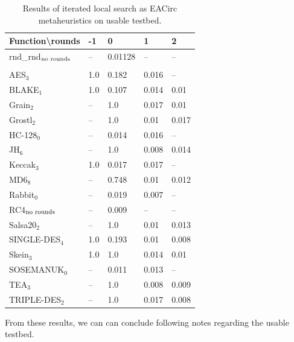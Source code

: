 \documentclass[
  print, %
  Table,   %
  nolof,     %
  nolot,     %
  11pt, %
  oneside  %
]{fithesis3}
\newcommand{\fd}{\cellcolor{red!13}}
\newcommand{\fn}{\cellcolor{green!13}}
\begin{document}
\begin{table}[H]
\centering
\begin{tabular}{l|l l l l}
Function\textbackslash{}rounds & -1 & 0 & 1 & 2\\ \hline
rnd\_rnd$_{\textnormal{no rounds}}$ & -- & \fn{}0.01128 & --         & --        \\\\
AES$_{3}$        & \fd{}1.0   & \fd{}0.182 & \fn{}0.016 & \fn{}--   \\
BLAKE$_{1}$      & \fd{}1.0   & \fd{}0.107 & \fn{}0.014 & \fn{}0.01 \\
Grain$_{2}$      & \fd{}--    & \fd{}1.0   & \fn{}0.017 & \fn{}0.01 \\
Grostl$_{2}$     & \fd{}--    & \fd{}1.0   & \fn{}0.01  & \fn{}0.017\\
HC-128$_{0}$     & \fd{}--    & \fn{}0.014 & \fn{}0.016 & \fn{}--   \\
JH$_{6}$         & \fd{}--    & \fd{}1.0   & \fn{}0.008 & \fn{}0.014\\
Keccak$_{3}$     & \fd{}1.0   & \fn{}0.017 & \fn{}0.017 & \fn{}--   \\
MD6$_{8}$        & \fd{}--    & \fd{}0.748 & \fn{}0.01  & \fn{}0.012\\
Rabbit$_{0}$     & \fd{}--    & \fn{}0.019 & \fn{}0.007 & \fn{}--   \\
RC4$_{\textnormal{no rounds}}$& --         & \fn{}0.009 & --         & --        \\
Salsa20$_{2}$    & \fd{}--    & \fd{}1.0   & \fn{}0.01  & \fn{}0.013\\
SINGLE-DES$_{4}$ & \fd{}1.0   & \fd{}0.193 & \fn{}0.01  & \fn{}0.008\\
Skein$_{3}$      & \fd{}1.0   & \fd{}1.0   & \fn{}0.014 & \fn{}0.01 \\
SOSEMANUK$_{0}$  & \fd{}--    & \fn{}0.011 & \fn{}0.013 & \fn{}--   \\
TEA$_{3}$        & \fd{}--    & \fd{}1.0   & \fn{}0.008 & \fn{}0.009\\
TRIPLE-DES$_{2}$ & \fd{}--    & \fd{}1.0   & \fn{}0.017 & \fn{}0.008
\end{tabular}
\caption{Results of iterated local search as EACirc metaheuristics on usable testbed.}
\label{table:res-usable-ils}
\end{table}

From these results, we can can conclude following notes regarding the usable testbed.
\end{document}

